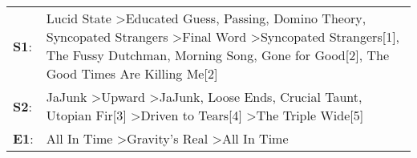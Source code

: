 \begin{supertabular}{p{0.03\textwidth}p{0.92\textwidth}}
 \textbf{S1}:  &  Lucid State\textsuperscript{} \textgreater \enspace Educated Guess\textsuperscript{}, \enspace Passing\textsuperscript{}, \enspace Domino Theory\textsuperscript{}, \enspace Syncopated Strangers\textsuperscript{} \textgreater \enspace Final Word\textsuperscript{} \textgreater \enspace Syncopated Strangers[1]\textsuperscript{}, \enspace The Fussy Dutchman\textsuperscript{}, \enspace Morning Song\textsuperscript{}, \enspace Gone for Good[2]\textsuperscript{}, \enspace The Good Times Are Killing Me[2]\textsuperscript{}  \enspace  \\
 \textbf{S2}:  &                                                                                                                                                                  JaJunk\textsuperscript{} \textgreater \enspace Upward\textsuperscript{} \textgreater \enspace JaJunk\textsuperscript{}, \enspace Loose Ends\textsuperscript{}, \enspace Crucial Taunt\textsuperscript{}, \enspace Utopian Fir[3]\textsuperscript{} \textgreater \enspace Driven to Tears[4]\textsuperscript{} \textgreater \enspace The Triple Wide[5]\textsuperscript{}  \enspace  \\
 \textbf{E1}:  &                                                                                                                                                                                                                                                                                                                                                                                                  All In Time\textsuperscript{} \textgreater \enspace Gravity's Real\textsuperscript{} \textgreater \enspace All In Time\textsuperscript{}  \enspace  \\
\end{supertabular}
